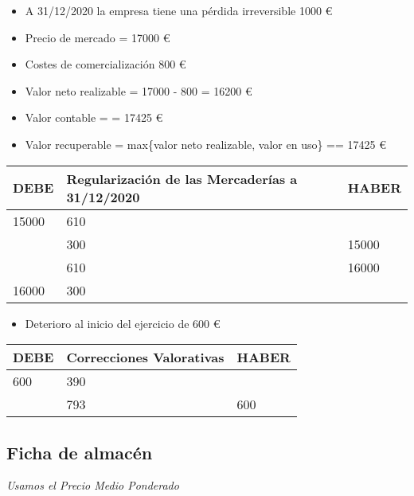 \documentclass[a4paper,12pt]{article}
\newcommand{\fec}{31/12/}
\newcommand{\valorrecuperable}{Valor recuperable = max\{valor neto realizable, valor en uso\} =}
\newcommand{\VC}{Valor contable = }
\begin{document}
\begin{itemize}
    \item A \fec2020 la empresa tiene una pérdida irreversible 1000 \euro
    \item Precio de mercado = 17000 \euro
    \item Costes de comercialización 800 \euro
    \item Valor neto realizable = 17000 - 800 = 16200 \euro
    \item \VC = 17425 \euro
    \item \valorrecuperable = 17425 \euro
\end{itemize}
\begin{table}[H]
    \centering
    \begin{tabular}{|p{3cm}|p{6cm}|p{3cm}|}
    \hline
    \textbf{DEBE} & \textbf{Regularización de las Mercaderías a \fec2020} & \textbf{HABER} \\
    \hline
    15000& 610& \\
    \hline
    & 300 &15000 \\
    \hline
    & 610 &16000\\
    \hline
    16000 & 300& \\
    \hline
    \end{tabular}
\end{table}

\begin{itemize}
    \item Deterioro al inicio del ejercicio de 600 \euro
\end{itemize}

\begin{table}[H]
    \centering
    \begin{tabular}{|p{3cm}|p{6cm}|p{3cm}|}
    \hline
    \textbf{DEBE} & \textbf{Correcciones Valorativas} & \textbf{HABER} \\
    \hline
    600 & 390 & \\
    \hline
    & 793 & 600\\
    \hline
    \end{tabular}
\end{table}

\subsection{Ficha de almacén}
\textit{Usamos el Precio Medio Ponderado}
\end{document}
